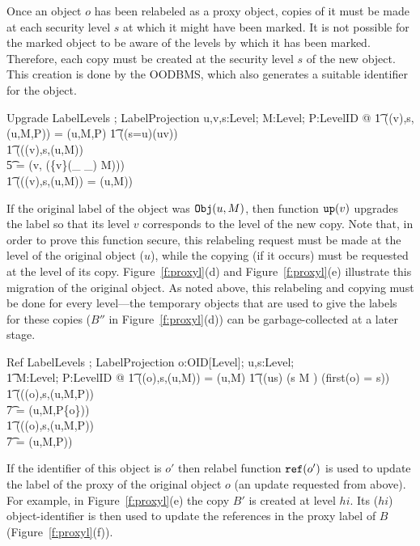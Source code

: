 Once an object $o$ has been relabeled as a proxy object, 
copies of it must be made at each security level $s$ at 
which it  might have been marked.
It is not possible for the marked object to be aware of the 
levels by which it has been marked.
Therefore, each copy must be created at the security level
$s$ of the new object.  This creation is done by the OODBMS, which also 
generates a suitable identifier for the object. 
\begin{schema}{Upgrade}
LabelLevels ; LabelProjection
\where
\forall u,v,s:Level; M:\power Level; P:Level\pfun ID @
\also
\t1 \Rfun(\lup(v),s,\Proxy(u,M,P)) = \Proxy(u,M,P) \land 
\also
\t1 \IF ((s=u)\land (u\fleq v)) \\
\t1 \THEN (\Rfun(\lup(v),s,\Object(u,M)) \\
\t5      = \Object(v, \ran(\{v\}\dres (\_ \fleq \_) \rres M))) \\
\t1 \ELSE (\Rfun(\lup(v),s,\Object(u,M)) = \Object(u,M))
\end{schema}
If the original label of the object was $\mbox{\tt Obj}(u,M)$, then 
function $\mbox{\tt up}(v)$ upgrades the label so that its level $v$ corresponds to 
the level of the new copy. 
 Note that, in order to prove this function secure,  
this relabeling request must be made 
at the level of the  original object ($u$), while the copying 
(if it occurs) must be requested at the level of its copy. 
Figure~\ref{f:proxyl}(d) and Figure~\ref{f:proxyl}(e) 
illustrate this migration of the original object. 
As noted above, this relabeling and copying  must be done for every
level---the temporary objects that are 
used to give the labels for these copies  ($B''$ in
Figure~\ref{f:proxyl}(d)) can be garbage-collected at a later stage.

\begin{schema}{Ref}
LabelLevels ; LabelProjection
\where
\forall o:OID[Level]; u,s:Level; \\
\t1 M:\power Level; P:Level\pfun ID @ 
\also
\t1 \Rfun((o),s,\Object(u,M)) = \Object(u,M)   \land 
\also
\t1 \IF ((u\fleq s) \land (s \in M ) \land (first(o) = s)) \\
\t1 \THEN (\Rfun((o),s,\Proxy(u,M,P)) \\
\t7 = \Proxy(u,M,P\oplus\{o\})) \\
\t1 \ELSE (\Rfun((o),s,\Proxy(u,M,P)) \\
\t7 = \Proxy(u,M,P))
\end{schema}
If the identifier of this object is  $o'$ then
relabel function $\mbox{\tt ref}(o')$ is used to update the label of the proxy
of the original object $o$ (an update requested from above).
For example, in Figure~\ref{f:proxyl}(e) the copy $B'$ is created at 
level $hi$. Its ($hi$) object-identifier is then used to 
update the references in the proxy label of $B$ (Figure~\ref{f:proxyl}(f)). 


